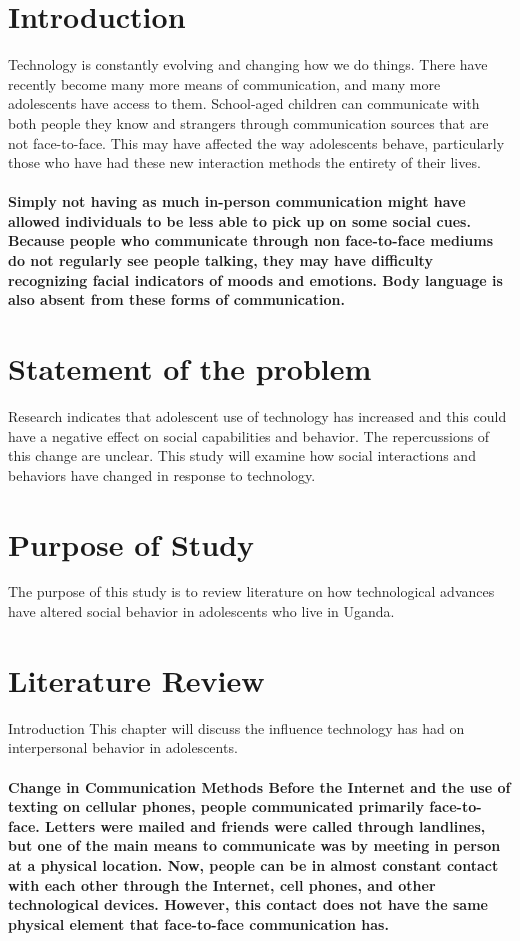 \documentclass[10pt,]{article}
\begin{document}
\section{Introduction}
Technology is constantly evolving and changing how we do things. There have recently become many more means of communication, and many more adolescents have access to them. School-aged children can communicate with both people they know and strangers through communication sources that are not face-to-face. This may have affected the way adolescents behave, particularly those who have had these new interaction methods the entirety of their lives. 
\paragraph{Simply not having as much in-person communication might have allowed individuals to be less able to pick up on some social cues. Because people who communicate through non face-to-face mediums do not regularly see people talking, they may have difficulty recognizing facial indicators of moods and emotions. Body language is also absent from these forms of communication. } 
\section{Statement of the problem}
Research indicates that adolescent use of technology has increased and this could have a negative effect on social capabilities and behavior. The repercussions of this change are unclear. This study will examine how social interactions and behaviors have changed in response to technology.
\section{Purpose of Study}
The purpose of this study is to review literature on how technological advances have altered social behavior in adolescents who live in Uganda.
\section{Literature Review}
Introduction
This chapter will discuss the influence technology has had on interpersonal behavior in adolescents. 

\paragraph{Change in Communication Methods
Before the Internet and the use of texting on cellular phones, people communicated primarily face-to-face. Letters were mailed and friends were called through landlines, but one of the main means to communicate was by meeting in person at a physical location. Now, people can be in almost constant contact with each other through the Internet, cell phones, and other technological devices. However, this contact does not have the same physical element that face-to-face communication has.}
\end{document}

